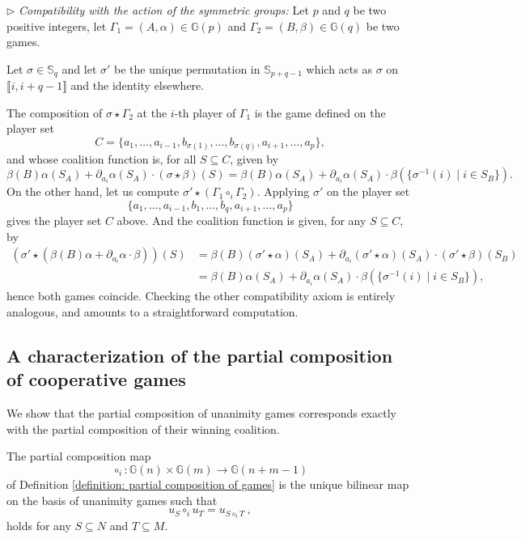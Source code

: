 \documentclass[a4paper,12pt]{amsart}
\begin{document}
\medskip

$\triangleright$ \emph{Compatibility with the action of the symmetric groups:} Let $p$ and $q$ be two positive integers, let $\Gamma_1 = (A, \alpha) \in \mathbb{G}(p)$ and $\Gamma_2 = (B, \beta) \in \mathbb{G}(q)$ be two games.

\medskip 

Let $\sigma \in \mathbb{S}_q$ and let $\sigma'$ be the unique permutation in $\mathbb{S}_{p+q-1}$ which acts as $\sigma$ on $\llbracket i, i+q-1 \rrbracket$ and the identity elsewhere. 

\medskip

The composition of $\sigma \star \Gamma_2$ at the $i$-th player of $\Gamma_1$ is the game defined on the player set 
\[
C = \{a_1, \ldots, a_{i-1}, b_{\sigma(1)}, \ldots, b_{\sigma(q)}, a_{i+1}, \ldots, a_p\},
\]
and whose coalition function is, for all $S \subseteq C$, given by 
\[
\beta(B)\alpha(S_A) + \partial_{a_i} \alpha(S_A) \cdot (\sigma \star \beta)(S) = \beta(B)\alpha(S_A) + \partial_{a_i} \alpha(S_A) \cdot \beta(\{\sigma^{-1}(i) \mid i \in S_B\}). 
\]
On the other hand, let us compute $\sigma' \star (\Gamma_1 \circ_i \Gamma_2)$. Applying $\sigma'$ on the player set 
\[
\{a_1, \ldots, a_{i-1}, b_1, \ldots, b_q, a_{i+1}, \ldots, a_p\}
\]
gives the player set $C$ above. And the coalition function is given, for any $S \subseteq C$, by 
\[ \begin{aligned} 
(\sigma' \star (\beta(B)\alpha + \partial_{a_i} \alpha \cdot \beta))(S) & = \beta(B)(\sigma' \star \alpha)(S_A) + \partial_{a_i} (\sigma' \star \alpha)(S_A) \cdot (\sigma' \star \beta)(S_B) \\
& = \beta(B)\alpha(S_A) + \partial_{a_i} \alpha(S_A) \cdot \beta(\{\sigma^{-1}(i) \mid i \in S_B\}),
\end{aligned} \]
hence both games coincide. Checking the other compatibility axiom is entirely analogous, and amounts to a straightforward computation. 
\endproof 

\subsection{A characterization of the partial composition of cooperative games}
We show that the partial composition of unanimity games corresponds exactly with the partial composition of their winning coalition. 

\begin{proposition}\label{Proposition: universal property of the partial composition of games}
The partial composition map
\[
\circ_i: \mathbb{G}(n) \times \mathbb{G}(m) \longrightarrow \mathbb{G}(n + m -1)
\]
of Definition \ref{definition: partial composition of games} is the unique bilinear map on the basis of unanimity games such that
\[
u_S \circ_i u_T = u_{S \diamond_i T}~,
\]
holds for any $S \subseteq N$ and $T \subseteq M$. 
\end{proposition}
\end{document}
